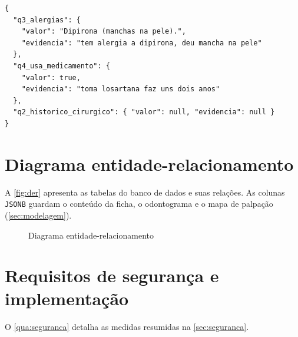 \begin{lstlisting}[caption={Exemplo de sugestão gerada para a seção de história médica}, label=cod:saida-ia]
{
  "q3_alergias": {
    "valor": "Dipirona (manchas na pele).",
    "evidencia": "tem alergia a dipirona, deu mancha na pele"
  },
  "q4_usa_medicamento": {
    "valor": true,
    "evidencia": "toma losartana faz uns dois anos"
  },
  "q2_historico_cirurgico": { "valor": null, "evidencia": null }
}
\end{lstlisting}

\chapter{Diagrama entidade-relacionamento}
\label{apendice:der}

A \autoref{fig:der} apresenta as tabelas do banco de dados e suas relações. As colunas \texttt{JSONB} guardam o conteúdo da ficha, o odontograma e o mapa de palpação (\autoref{sec:modelagem}).

\begin{figure}[htbp]
	\caption{Diagrama entidade-relacionamento}
	\label{fig:der}
	\centering
	\resizebox{\textwidth}{!}{}
\end{figure}

\chapter{Requisitos de segurança e implementação}
\label{apendice:seguranca}

O \autoref{qua:seguranca} detalha as medidas resumidas na \autoref{sec:seguranca}.

